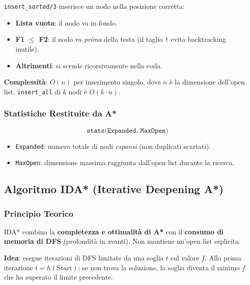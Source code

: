 \documentclass[12pt,a4paper]{article}
\begin{document}
\texttt{insert\_sorted/3} inserisce un nodo nella posizione corretta:
\begin{itemize}[noitemsep]
  \item \textbf{Lista vuota}: il nodo va in fondo.
  \item \textbf{F1 $\le$ F2}: il nodo va \emph{prima} della testa (il taglio \texttt{!}
        evita backtracking inutile).
  \item \textbf{Altrimenti}: si scende ricorsivamente nella coda.
\end{itemize}

\noindent\textbf{Complessità}: $O(n)$ per inserimento singolo, dove $n$ è la
dimensione dell'open list. \texttt{insert\_all} di $k$ nodi è $O(k \cdot n)$.

\subsubsection{Statistiche Restituite da A*}

\[
  \texttt{stats(Expanded, MaxOpen)}
\]
\begin{itemize}[noitemsep]
  \item \texttt{Expanded}: numero totale di nodi \emph{espansi} (non duplicati scartati).
  \item \texttt{MaxOpen}: dimensione massima raggiunta dall'open list durante la ricerca.
\end{itemize}

\subsection{Algoritmo IDA* (Iterative Deepening A*)}

\subsubsection{Principio Teorico}

IDA* combina la \textbf{completezza e ottimalità di A*} con il \textbf{consumo di
memoria di DFS} (profondità in avanti). Non mantiene un'open list esplicita.

\textbf{Idea}: esegue iterazioni di DFS limitate da una soglia $t$ sul valore $f$.
Alla prima iterazione $t = h(\text{Start})$; se non trova la soluzione, la
soglia diventa il minimo $f$ che ha superato il limite precedente.
\end{document}
